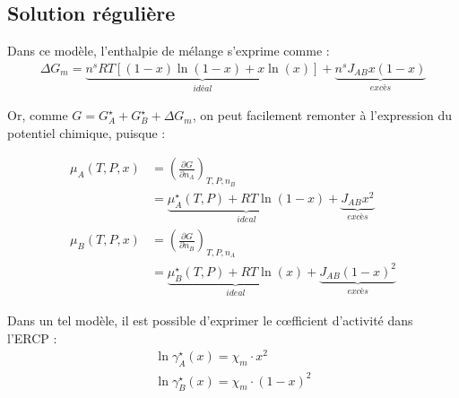 \documentclass[a4paper]{book}
\begin{document}
\subsection{Solution régulière}

Dans ce modèle, l'enthalpie de mélange s'exprime comme : 
\begin{align*}
\Delta G_m = \underbrace{n^s RT \left[ (1-x) \ln (1-x) + x \ln (x) \right]}_{idéal} +  \underbrace{n^s J_{AB} x (1-x)}_{excès}
\end{align*}

Or, comme $G = G_A^\star + G_B^\star + \Delta G_m$, on peut facilement remonter à l'expression du potentiel chimique, puisque :

\begin{align*}
  \mu_A (T, P, x) &= \left( \frac{\partial G}{\partial n_A} \right)_{T, P, n_B} \\
  &= \underbrace{\mu_A^\star (T, P) + RT \ln (1-x)}_{ideal} + \underbrace{J_{AB} x^2}_{excès} \\
  \mu_B (T, P, x) &= \left( \frac{\partial G}{\partial n_B} \right)_{T, P, n_A} \\
  &= \underbrace{\mu_B^\star (T, P) + RT \ln (x)}_{ideal} + \underbrace{J_{AB} (1-x)^2}_{excès}
\end{align*}

Dans un tel modèle, il est possible d'exprimer le c{\oe}fficient d'activité dans l'ERCP : 
\begin{align*}
\ln \gamma_A^\star (x) = \chi_m \cdot x^2 \\ 
\ln \gamma_B^\star (x) = \chi_m \cdot (1-x)^2
\end{align*}
\end{document}
